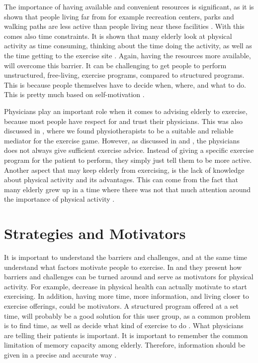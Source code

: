 The importance of having available and convenient resources is significant, as it is shown that people living far from for example recreation centers, parks and walking paths are less active than people living near these facilities \cite{schutzer}. With this comes also time constraints. It is shown that many elderly look at physical activity as time consuming, thinking about the time doing the activity, as well as the time getting to the exercise site \cite{schutzer} \cite{chao}. Again, having the resources more available, will overcome this barrier. It can be challenging to get people to perform unstructured, free-living, exercise programs, compared to structured programs. This is because people themselves have to decide when, where, and what to do. This is pretty much based on self-motivation \cite{chao}.  

Physicians play an important role when it comes to advising elderly to exercise, because most people have respect for and trust their physicians. This was also discussed in \cite{project}, where we found physiotherapists to be a suitable and reliable mediator for the exercise game. However, as discussed in \cite{schutzer} and \cite{chao}, the physicians does not always give sufficient exercise advice. Instead of giving a specific exercise program for the patient to perform, they simply just tell them to be more active. Another aspect that may keep elderly from exercising, is the lack of knowledge about physical activity and its advantages. This can come from the fact that many elderly grew up in a time where there was not that much attention around the importance of physical activity \cite{schutzer}. 

\section{Strategies and Motivators}
It is important to understand the barriers and challenges, and at the same time understand what factors motivate people to exercise. In \cite{schutzer} and \cite{chao} they present how barriers and challenges can be turned around and serve as motivators for physical activity. For example, decrease in physical health can actually motivate to start exercising. In addition,  having more time, more information, and living closer to exercise offerings, could be motivators.  A structured program offered at a set time, will probably be a good solution for this user group, as a common problem is to find time, as well as decide what kind of exercise to do \cite{chao}. What physicians are telling their patients is important. It is important to remember the common limitation of memory capacity among elderly. Therefore, information should be given in a precise and accurate way \cite{chao}.  

